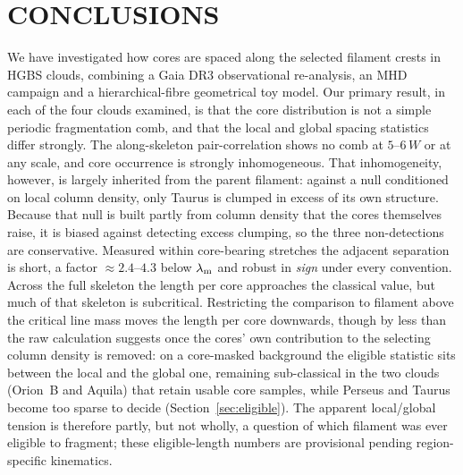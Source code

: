 \documentclass[usenatbib,twoside,twocolumn]{mnras}
\begin{document}
\section{CONCLUSIONS}

We have investigated how cores are spaced along the selected filament crests in HGBS clouds, combining a Gaia DR3 observational re-analysis, an MHD campaign and a hierarchical-fibre geometrical toy model. Our primary result, in each of the four clouds examined, is that the core distribution is not a simple periodic fragmentation comb, and that the local and global spacing statistics differ strongly. The along-skeleton pair-correlation shows no comb at $5$--$6\,W$ or at any scale, and core occurrence is strongly inhomogeneous. That inhomogeneity, however, is largely inherited from the parent filament: against a null conditioned on local column density, only Taurus is clumped in excess of its own structure. Because that null is built partly from column density that the cores themselves raise, it is biased against detecting excess clumping, so the three non-detections are conservative. Measured within core-bearing stretches the adjacent separation is short, a factor $\approx2.4$--$4.3$ below $\lambda_{\rm m}$ and robust in \emph{sign} under every convention. Across the full skeleton the length per core approaches the classical value, but much of that skeleton is subcritical. Restricting the comparison to filament above the critical line mass moves the length per core downwards, though by less than the raw calculation suggests once the cores' own contribution to the selecting column density is removed: on a core-masked background the eligible statistic sits between the local and the global one, remaining sub-classical in the two clouds (Orion~B and Aquila) that retain usable core samples, while Perseus and Taurus become too sparse to decide (Section~\ref{sec:eligible}). The apparent local/global tension is therefore partly, but not wholly, a question of which filament was ever eligible to fragment; these eligible-length numbers are provisional pending region-specific kinematics.
\end{document}
